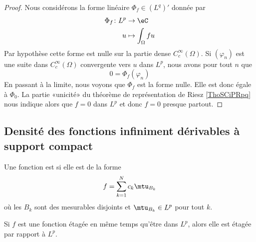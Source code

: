 \begin{proof}
    Nous considérons la forme linéaire \( \Phi_f\in (L^q)'\) donnée par
    \begin{equation}
        \begin{aligned}
            \Phi_f\colon L^p&\to \eC \\
            u&\mapsto \int_{\Omega}fu
        \end{aligned}
    \end{equation}
    Par hypothèse cette forme est nulle sur la partie dense \(  C^{\infty}_c(\Omega)\). Si \( (\varphi_n)\) est une suite dans \(  C^{\infty}_c(\Omega)\) convergente vers \( u\) dans \( L^p\), nous avons pour tout \( n\) que
    \begin{equation}
        0=\Phi_f(\varphi_n)
    \end{equation}
    En passant à la limite, nous voyons que \( \Phi_f\) est la forme nulle. Elle est donc égale à \( \Phi_0\). La partie «unicité» du théorème de représentation de Riesz \ref{ThoSCiPRpq} nous indique alors que \( f=0\) dans \( L^p\) et donc \( f=0\) presque partout.
\end{proof}

\subsection{Densité des fonctions infiniment dérivables à support compact}

\begin{definition}
    Une fonction est  si elle est de la forme
    \begin{equation}
        f=\sum_{k=1}^Nc_k\mtu_{B_k}
    \end{equation}
    où les \( B_k\) sont des mesurables disjoints et \( \mtu_{B_k}\in L^p\) pour tout \( k\).
\end{definition}

\begin{lemma}   \label{LemWHIRdaX}
    Si \( f\) est une fonction étagée en même temps qu'être dans \( L^p\), alors elle est étagée par rapport à \( L^p\).
\end{lemma}

